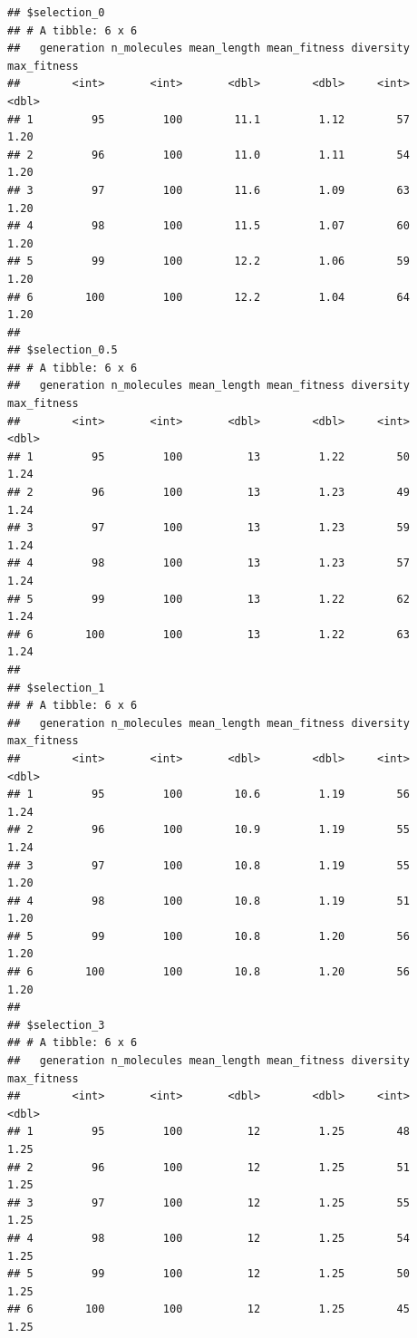 \documentclass[
  oneside,
  openany]{book}
\begin{document}
\begin{verbatim}
## $selection_0
## # A tibble: 6 x 6
##   generation n_molecules mean_length mean_fitness diversity max_fitness
##        <int>       <int>       <dbl>        <dbl>     <int>       <dbl>
## 1         95         100        11.1         1.12        57        1.20
## 2         96         100        11.0         1.11        54        1.20
## 3         97         100        11.6         1.09        63        1.20
## 4         98         100        11.5         1.07        60        1.20
## 5         99         100        12.2         1.06        59        1.20
## 6        100         100        12.2         1.04        64        1.20
## 
## $selection_0.5
## # A tibble: 6 x 6
##   generation n_molecules mean_length mean_fitness diversity max_fitness
##        <int>       <int>       <dbl>        <dbl>     <int>       <dbl>
## 1         95         100          13         1.22        50        1.24
## 2         96         100          13         1.23        49        1.24
## 3         97         100          13         1.23        59        1.24
## 4         98         100          13         1.23        57        1.24
## 5         99         100          13         1.22        62        1.24
## 6        100         100          13         1.22        63        1.24
## 
## $selection_1
## # A tibble: 6 x 6
##   generation n_molecules mean_length mean_fitness diversity max_fitness
##        <int>       <int>       <dbl>        <dbl>     <int>       <dbl>
## 1         95         100        10.6         1.19        56        1.24
## 2         96         100        10.9         1.19        55        1.24
## 3         97         100        10.8         1.19        55        1.20
## 4         98         100        10.8         1.19        51        1.20
## 5         99         100        10.8         1.20        56        1.20
## 6        100         100        10.8         1.20        56        1.20
## 
## $selection_3
## # A tibble: 6 x 6
##   generation n_molecules mean_length mean_fitness diversity max_fitness
##        <int>       <int>       <dbl>        <dbl>     <int>       <dbl>
## 1         95         100          12         1.25        48        1.25
## 2         96         100          12         1.25        51        1.25
## 3         97         100          12         1.25        55        1.25
## 4         98         100          12         1.25        54        1.25
## 5         99         100          12         1.25        50        1.25
## 6        100         100          12         1.25        45        1.25
\end{verbatim}
\end{document}
